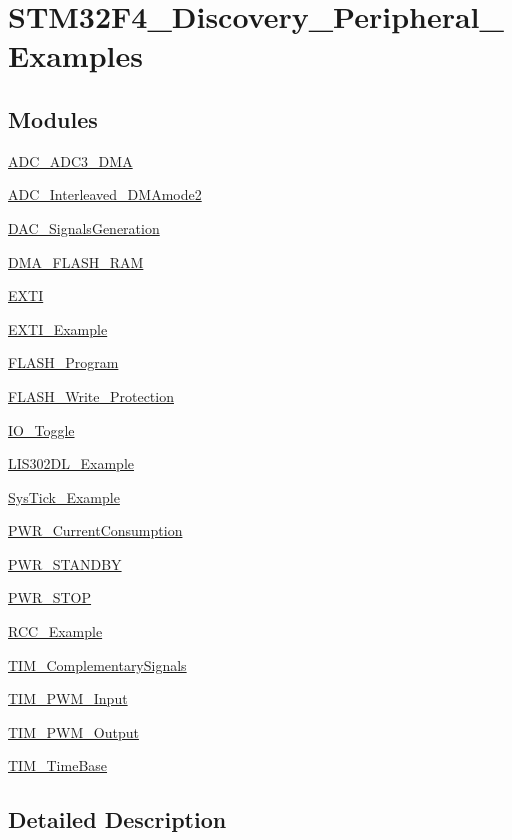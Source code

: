 \hypertarget{group___s_t_m32_f4___discovery___peripheral___examples}{\section{S\-T\-M32\-F4\-\_\-\-Discovery\-\_\-\-Peripheral\-\_\-\-Examples}
\label{group___s_t_m32_f4___discovery___peripheral___examples}
}
\subsection*{Modules}
\begin{DoxyCompactItemize}
\item 
\hyperlink{group___a_d_c___a_d_c3___d_m_a}{A\-D\-C\-\_\-\-A\-D\-C3\-\_\-\-D\-M\-A}
\item 
\hyperlink{group___a_d_c___interleaved___d_m_amode2}{A\-D\-C\-\_\-\-Interleaved\-\_\-\-D\-M\-Amode2}
\item 
\hyperlink{group___d_a_c___signals_generation}{D\-A\-C\-\_\-\-Signals\-Generation}
\item 
\hyperlink{group___d_m_a___f_l_a_s_h___r_a_m}{D\-M\-A\-\_\-\-F\-L\-A\-S\-H\-\_\-\-R\-A\-M}
\item 
\hyperlink{group___e_x_t_i}{E\-X\-T\-I}
\item 
\hyperlink{group___e_x_t_i___example}{E\-X\-T\-I\-\_\-\-Example}
\item 
\hyperlink{group___f_l_a_s_h___program}{F\-L\-A\-S\-H\-\_\-\-Program}
\item 
\hyperlink{group___f_l_a_s_h___write___protection}{F\-L\-A\-S\-H\-\_\-\-Write\-\_\-\-Protection}
\item 
\hyperlink{group___i_o___toggle}{I\-O\-\_\-\-Toggle}
\item 
\hyperlink{group___l_i_s302_d_l___example}{L\-I\-S302\-D\-L\-\_\-\-Example}
\item 
\hyperlink{group___sys_tick___example}{Sys\-Tick\-\_\-\-Example}
\item 
\hyperlink{group___p_w_r___current_consumption}{P\-W\-R\-\_\-\-Current\-Consumption}
\item 
\hyperlink{group___p_w_r___s_t_a_n_d_b_y}{P\-W\-R\-\_\-\-S\-T\-A\-N\-D\-B\-Y}
\item 
\hyperlink{group___p_w_r___s_t_o_p}{P\-W\-R\-\_\-\-S\-T\-O\-P}
\item 
\hyperlink{group___r_c_c___example}{R\-C\-C\-\_\-\-Example}
\item 
\hyperlink{group___t_i_m___complementary_signals}{T\-I\-M\-\_\-\-Complementary\-Signals}
\item 
\hyperlink{group___t_i_m___p_w_m___input}{T\-I\-M\-\_\-\-P\-W\-M\-\_\-\-Input}
\item 
\hyperlink{group___t_i_m___p_w_m___output}{T\-I\-M\-\_\-\-P\-W\-M\-\_\-\-Output}
\item 
\hyperlink{group___t_i_m___time_base}{T\-I\-M\-\_\-\-Time\-Base}
\end{DoxyCompactItemize}


\subsection{Detailed Description}
